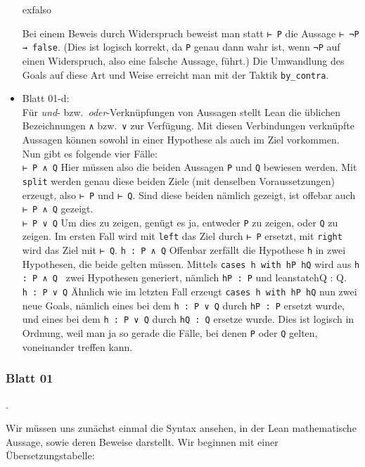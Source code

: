 \documentclass[11pt]{article}
\newcommand{\leanin}{\texttt}
\newcommand{\leanstate}{\texttt}
\begin{document}
\begin{itemize}
  exfalso
  
  Bei einem Beweis durch Widerspruch beweist man statt \leanstate{⊢ P} die Aussage \leanstate{⊢ ¬P → false}. (Dies ist logisch korrekt, da \leanstate{P} genau dann wahr ist, wenn \leanstate{¬P} auf einen Widerspruch, also eine falsche Aussage, führt.) Die Umwandlung des Goals auf diese Art und Weise erreicht man mit der Taktik \leanin{by_contra}. 
\item Blatt 01-d: \\
  Für {\em und}- bzw.\ {\em oder}-Verknüpfungen von Aussagen stellt Lean die üblichen Bezeichnungen \leanstate{∧} bzw.\ \leanstate{∨} zur Verfügung. Mit diesen Verbindungen verknüpfte Aussagen können sowohl in einer Hypothese als auch im Ziel vorkommen. Nun gibt es folgende vier Fälle:\\
  \leanstate{⊢ P ∧ Q} Hier müssen also die beiden Aussagen \leanstate{P} und \leanstate{Q} bewiesen werden. Mit \leanin{split} werden genau diese beiden Ziele (mit denselben Voraussetzungen) erzeugt, also \leanstate{⊢ P} und \leanstate{⊢ Q}. Sind diese beiden nämlich gezeigt, ist offebar auch \leanstate{⊢ P ∧ Q} gezeigt. \\
  \leanstate{⊢ P ∨ Q} Um dies zu zeigen, genügt es ja, entweder \leanstate{P} zu zeigen, oder \leanstate{Q} zu zeigen. Im ersten Fall wird mit \leanin{left} das Ziel durch \leanstate{⊢ P} ersetzt, mit \leanin{right} wird das Ziel mit \leanstate{⊢ Q}. 
  \leanstate{h : P ∧ Q} Offenbar zerfällt die Hypothese \leanstate{h} in zwei Hypothesen, die beide gelten müssen. Mittels \leanin{cases h with hP hQ} wird aus \leanstate{h : P ∧ Q } zwei Hypothesen generiert, nämlich \leanstate{hP : P} und leanstate{hQ : Q}.\\
  \leanstate{h : P ∨ Q} Ähnlich wie im letzten Fall erzeugt \leanin{cases h with hP hQ} nun zwei neue Goals, nämlich eines bei dem \leanstate{h : P ∨ Q} durch \leanstate{hP : P} ersetzt wurde, und eines bei dem \leanstate{h : P ∨ Q} durch \leanstate{hQ : Q} ersetze wurde. Dies ist logisch in Ordnung, weil man ja so gerade die Fälle, bei denen \leanstate{P} oder \leanstate{Q} gelten, voneinander treffen kann. \\
\end{itemize}

\subsubsection*{Blatt 01}
. 

Wir müssen uns zunächst einmal die Syntax ansehen, in der Lean mathematische Aussage, sowie deren Beweise darstellt. Wir beginnen mit einer Übersetzungstabelle:
\end{document}
